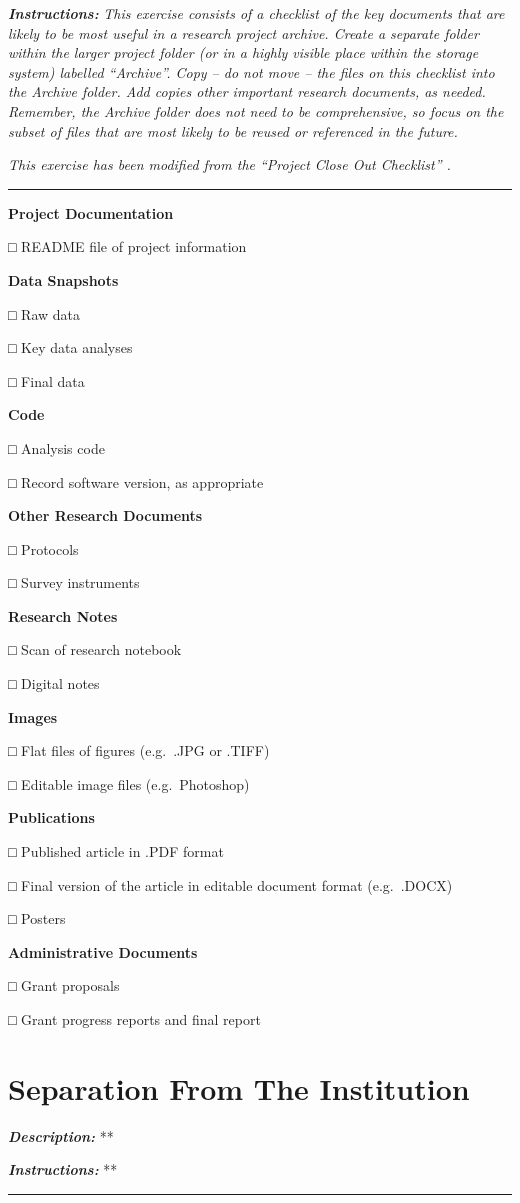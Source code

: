 \documentclass[
]{book}
\begin{document}
\textbf{\emph{Instructions:}} \emph{This exercise consists of a checklist of the key documents that are likely to be most useful in a research project archive. Create a separate folder within the larger project folder (or in a highly visible place within the storage system) labelled ``Archive''. Copy -- do not move -- the files on this checklist into the Archive folder. Add copies other important research documents, as needed. Remember, the Archive folder does not need to be comprehensive, so focus on the subset of files that are most likely to be reused or referenced in the future.}

\emph{This exercise has been modified from the ``Project Close Out Checklist'' \citet{briney_project_2020}.}

\begin{center}\rule{0.5\linewidth}{0.5pt}\end{center}

\textbf{Project Documentation}

□ README file of project information

\textbf{Data Snapshots}

□ Raw data

□ Key data analyses

□ Final data

\textbf{Code}

□ Analysis code

□ Record software version, as appropriate

\textbf{Other Research Documents}

□ Protocols

□ Survey instruments

\textbf{Research Notes}

□ Scan of research notebook

□ Digital notes

\textbf{Images}

□ Flat files of figures (e.g.~.JPG or .TIFF)

□ Editable image files (e.g.~Photoshop)

\textbf{Publications}

□ Published article in .PDF format

□ Final version of the article in editable document format (e.g.~.DOCX)

□ Posters

\textbf{Administrative Documents}

□ Grant proposals

□ Grant progress reports and final report

\hypertarget{separation}{%
\section{Separation From The Institution}\label{separation}}

\textbf{\emph{Description:}} **

\textbf{\emph{Instructions:}} **

\begin{center}\rule{0.5\linewidth}{0.5pt}\end{center}

  
\end{document}
